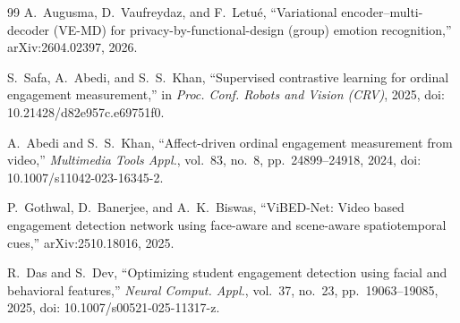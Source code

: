 \documentclass[journal]{IEEEtran}
\begin{document}
\begin{thebibliography}{99}
A.~Augusma, D.~Vaufreydaz, and F.~Letu\'{e}, ``Variational encoder--multi-decoder (VE-MD) for privacy-by-functional-design (group) emotion recognition,'' arXiv:2604.02397, 2026.

S.~Safa, A.~Abedi, and S.~S.~Khan, ``Supervised contrastive learning for ordinal engagement measurement,'' in \emph{Proc. Conf. Robots and Vision (CRV)}, 2025, doi: 10.21428/d82e957c.e69751f0.

A.~Abedi and S.~S.~Khan, ``Affect-driven ordinal engagement measurement from video,'' \emph{Multimedia Tools Appl.}, vol.~83, no.~8, pp.~24899--24918, 2024, doi: 10.1007/s11042-023-16345-2.

P.~Gothwal, D.~Banerjee, and A.~K.~Biswas, ``ViBED-Net: Video based engagement detection network using face-aware and scene-aware spatiotemporal cues,'' arXiv:2510.18016, 2025.

R.~Das and S.~Dev, ``Optimizing student engagement detection using facial and behavioral features,'' \emph{Neural Comput. Appl.}, vol.~37, no.~23, pp.~19063--19085, 2025, doi: 10.1007/s00521-025-11317-z.

\end{thebibliography}
\end{document}

